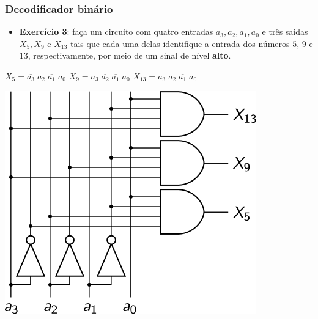 \documentclass{beamer}
\newcommand{\Not}[1]{\overline{#1}}
\begin{document}
\begin{frame}
\frametitle{Decodificador binário}

\begin{itemize}
\item \textbf{Exercício 3}: faça um circuito com quatro entradas $a_3, a_2, a_1,
a_0$ e três saídas $X_5, X_9$ e $X_{13}$ tais que cada uma delas identifique
a entrada dos números $5$, $9$ e $13$, respectivamente, por meio de um
sinal de nível \textbf{alto}.
\end{itemize}

\pause

$X_5 = \Not{a_3} \; a_2 \; \Not{a_1} \; a_0$ \hfill 
$X_9 = a_3 \; \Not{a_2} \; \Not{a_1} \; a_0$ \hfill
$X_{13} = a_3 \; a_2 \; \Not{a_1} \; a_0$

\pause

\begin{center}
\includegraphics{images/exemplo3}
\end{center}

\end{frame}
\end{document}

